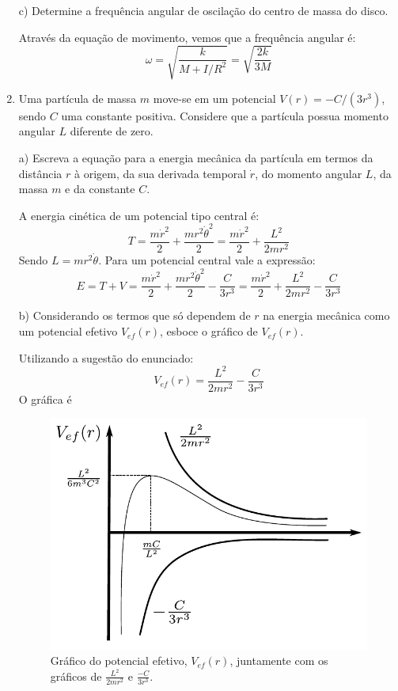 \begin{enumerate}[start=1,label={\bfseries Q\arabic*.}]
c) Determine a frequência angular de oscilação do centro de massa do disco.


\resposta Através da equação de movimento, vemos que a frequência angular é:
$$
\omega = \sqrt{\frac{k}{M + I/R^{2}}} = \sqrt{\frac{2k}{3M}}
$$


\item Uma partícula de massa $m$ move-se em um potencial $V(r) = -C/(3r^{3})$, sendo $C$ uma constante positiva. Considere que a partícula possua momento angular $L$ diferente de zero.

a) Escreva a equação para a energia mecânica da partícula em termos da distância $r$ à origem, da sua derivada temporal $\dot{r}$, do momento angular $L$, da massa $m$ e da constante $C$.

\resposta A energia cinética de um potencial tipo central é:
$$
T = \frac{m \dot{r}^{2}}{2} + \frac{m r^{2} \dot{\theta}^{2}}{2} = \frac{m \dot{r}^{2}}{2} + \frac{L^{2}}{2 m r^{2}}
$$
Sendo $L = mr^{2} \dot{\theta}$. Para um potencial central vale a expressão:
$$
E = T + V = \frac{m \dot{r}^{2}}{2} + \frac{m r^{2} \dot{\theta}^{2}}{2} - \frac{C}{3r^{3}} = \frac{m \dot{r}^{2}}{2} + \frac{L^{2}}{2 m r^{2}} - \frac{C}{3r^{3}}
$$


b) Considerando os termos que só dependem de $r$ na energia mecânica como um potencial efetivo $V_{ef}(r)$, esboce o gráfico de $V_{ef}(r)$.

\resposta Utilizando a sugestão do enunciado:
$$
V_{ef}(r) = \frac{L^{2}}{2mr^{2}} - \frac{C}{3r^{3}}
$$
O gráfica é
\begin{figure}[H]
  \centering
  \includegraphics[scale=0.7]{classica-img/potencial}
  \caption{Gráfico do potencial efetivo, $V_{ef}(r)$, juntamente com os gráficos de $\frac{L^{2}}{2mr^{2}}$ e $\frac{-C}{3r^{3}}$.}
\end{figure}


\end{enumerate}
